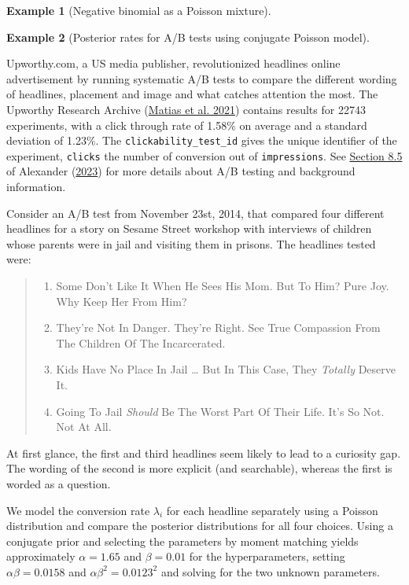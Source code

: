 \documentclass[
  11pt,
  letterpaper,
]{scrbook}
\providecommand{\tightlist}{%
  \setlength{\itemsep}{0pt}\setlength{\parskip}{0pt}}\usepackage{longtable,booktabs,array}
\theoremstyle{definition}
\newtheorem{example}{Example}[chapter]
\theoremstyle{definition}
\theoremstyle{definition}
\theoremstyle{plain}
\theoremstyle{remark}
\begin{document}
\begin{example}[Negative binomial as a Poisson
mixture]
\end{example}

\begin{example}[Posterior rates for A/B tests using conjugate Poisson
model]\protect\hypertarget{exm-abtest}{}\label{exm-abtest}

Upworthy.com, a US media publisher, revolutionized headlines online
advertisement by running systematic A/B tests to compare the different
wording of headlines, placement and image and what catches attention the
most. The Upworthy Research Archive
(\protect\hyperlink{ref-Matias:2021}{Matias et al. 2021}) contains
results for 22743 experiments, with a click through rate of 1.58\% on
average and a standard deviation of 1.23\%. The
\texttt{clickability\_test\_id} gives the unique identifier of the
experiment, \texttt{clicks} the number of conversion out of
\texttt{impressions}. See
\href{https://tellingstorieswithdata.com/08-hunt.html\#ab-testing}{Section
8.5} of Alexander (\protect\hyperlink{ref-Alexander:2023}{2023}) for
more details about A/B testing and background information.

Consider an A/B test from November 23st, 2014, that compared four
different headlines for a story on Sesame Street workshop with
interviews of children whose parents were in jail and visiting them in
prisons. The headlines tested were:

\begin{quote}
\begin{enumerate}
\def\labelenumi{\arabic{enumi}.}
\tightlist
\item
  Some Don't Like It When He Sees His Mom. But To Him? Pure Joy. Why
  Keep Her From Him?
\item
  They're Not In Danger. They're Right. See True Compassion From The
  Children Of The Incarcerated.
\item
  Kids Have No Place In Jail \ldots{} But In This Case, They
  \emph{Totally} Deserve It.
\item
  Going To Jail \emph{Should} Be The Worst Part Of Their Life. It's So
  Not. Not At All.
\end{enumerate}
\end{quote}

At first glance, the first and third headlines seem likely to lead to a
curiosity gap. The wording of the second is more explicit (and
searchable), whereas the first is worded as a question.

We model the conversion rate \(\lambda_i\) for each headline separately
using a Poisson distribution and compare the posterior distributions for
all four choices. Using a conjugate prior and selecting the parameters
by moment matching yields approximately \(\alpha = 1.65\) and
\(\beta = 0.01\) for the hyperparameters, setting
\(\alpha\beta = 0.0158\) and \(\alpha\beta^2=0.0123^2\) and solving for
the two unknown parameters.


\end{example}
\end{document}
